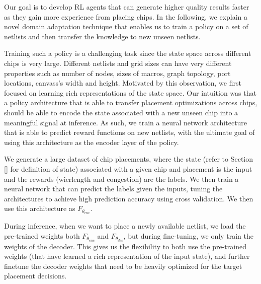 Our goal is to develop RL agents that can generate higher quality results faster as they gain more experience from placing chips. In the following, we explain a novel domain adaptation technique that enables us to train a policy on a set of netlists and then transfer the knowledge to new unseen netlists. 

Training such a policy is a challenging task since the state space across different chips is very large. Different netlists and grid sizes can have very different properties such as number of nodes, sizes of macros, graph topology, port locations, canvass's width and height. Motivated by this observation, we first focused on learning rich representations of the state space. Our intuition was that a policy architecture that is able to transfer placement optimizations across chips, should be able to  encode the state associated with a new unseen chip into a meaningful signal at inference. As such, we train a neural network architecture that is able to predict reward functions on new netlists, with the ultimate goal of using this architecture as the encoder layer of the policy.

We generate a large dataset of chip placements, where the state (refer to Section \ref{} for definition of state) associated with a given chip and placement is the input and the rewards (wierlength and congestion) are the labels. We then train a neural network that can predict the labels given the inputs, tuning the architectures to achieve high prediction accuracy using cross validation. We then use this architecture as $F_{\theta_{enc}}$. 

During inference, when we want to place a newly available netlist, we load the pre-trained weights both $F_{\theta_{enc}}$ and $F_{\theta_{dec}}$, but during fine-tuning, we only train the weights of the decoder. This gives us the flexibility to both use the pre-trained weights (that have learned a rich representation of the input state), and further finetune the decoder weights that need to be heavily optimized for the target placement decisions.  






